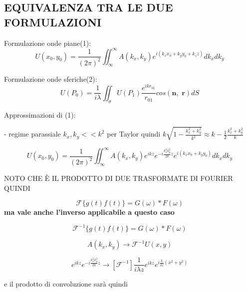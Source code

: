 \documentclass{article}
\begin{document}
\subsection{EQUIVALENZA TRA LE DUE FORMULAZIONI}
Formulazione onde piane(1):
\begin{equation}
U(x_{0},y_{0})=\frac{1}{(2\pi)^{2}}\iint_{\infty}^{\infty} A(k_{x},k_{y} ) e^{i( k_{x} x_{0} +k_{y} y_{0} +k_{z} z)}dk_{x}dk_{y} 				
\end{equation}

Formulazione onde sferiche(2):
\begin{equation}
U(P_{0}) = \frac{1}{i\lambda} \iint_\sigma U(P_{1}) \frac{e^{i k r_{01}}}{r_{01}} cos(\textbf{n} , \textbf{ r})dS
\end{equation}

Approssimazioni di (1): 

- regime parassiale
$k_{x},k_{y} << k^{2}$
per Taylor quindi
$k \sqrt{1 - \frac{ k_{x} ^{2} + k_{y} ^{2} }{ k^{2} }}\approx k -\frac{1}{2} \frac{k_{x} ^{2} + k_{y} ^{2}}{k}$

\begin{equation}
U(x_{0},y_{0})=\frac{1}{(2\pi)^{2}}\iint_{\infty}^{\infty} A(k_{x},k_{y} )  e^{i k z} e^{- i \frac{k_{x}^{2} k_{y}^{2}}{2k} z} e^{i( k_{x} x_{0} +k_{y} y_{0} )} dk_{x}dk_{y} 				
\end{equation}

NOTO CHE È IL PRODOTTO DI DUE TRASFORMATE DI FOURIER QUINDI 

\begin{equation}
\mathscr{F} 	 \{g(t) f(t)\}= G(\omega) * F(\omega)
\end{equation}
\textbf{ma vale anche l'inverso applicabile a questo caso }

\begin{equation}
\mathscr{F}^{-1} 	 \{g(t) f(t)\}= G(\omega) * F(\omega)
\end{equation}

\begin{equation}
A(k_{x}, k_{y})\longrightarrow{\mathscr{F}^{-1} } U(x, y)
\end{equation}

\begin{equation}
e^{i k z} e^{- i \frac{k_{x}^{2} k_{y}^{2}}{2k} z}\longrightarrow[\mathscr{F}^{-1} ]  \frac{1}{i \lambda z} e^{i k z} e^{i \frac{k}{2z} (x^{2}+ y^{2})}
\end{equation}

e il prodotto di convoluzione sarà quindi
\end{document}
